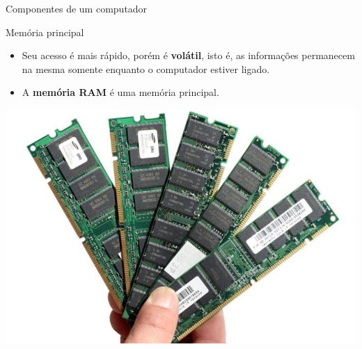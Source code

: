\begin{frame}{Componentes de um computador}
	\begin{block}{Memória principal}
		\begin{itemize}
			\item Seu acesso é mais rápido, porém é \textbf{volátil}, isto é, as
			      informações permanecem na mesma somente enquanto o
			      computador estiver ligado.
			\item A \textbf{memória RAM} é uma memória principal.
		\end{itemize}
	\end{block}

	\centering
	\includegraphics[width=0.6\linewidth]{Figuras/Ch01/fig35}
\end{frame}


